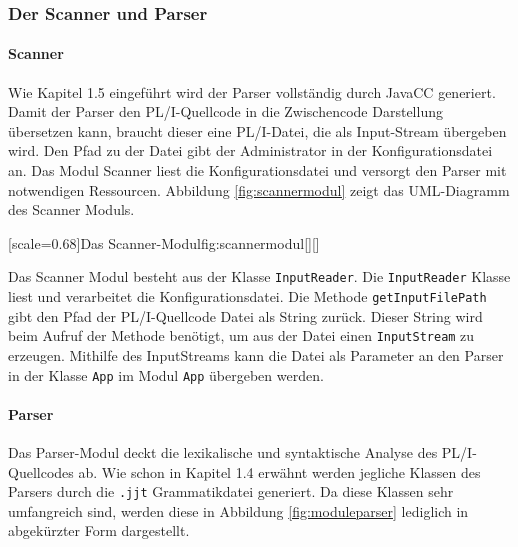 \subsubsection{Der Scanner und Parser}
\paragraph{Scanner}
Wie Kapitel 1.5 eingeführt wird der Parser vollständig durch 
JavaCC generiert.
Damit der Parser den PL/I-Quellcode in die Zwischencode Darstellung übersetzen kann,
braucht dieser eine PL/I-Datei, die als Input-Stream übergeben wird.
Den Pfad zu der Datei gibt der Administrator in der Konfigurationsdatei an.
Das Modul Scanner liest die Konfigurationsdatei und versorgt den Parser mit notwendigen Ressourcen.
Abbildung \ref{fig:scannermodul} zeigt das UML-Diagramm des Scanner Moduls.

[scale=0.68]{Das Scanner-Modul}{fig:scannermodul}[][]

Das Scanner Modul besteht aus der Klasse \verb+InputReader+. 
Die \verb+InputReader+ Klasse liest und verarbeitet die Konfigurationsdatei. Die Methode \verb+getInputFilePath+ gibt den Pfad der PL/I-Quellcode Datei als String zurück.
Dieser String wird beim Aufruf der  Methode benötigt, um aus der Datei einen \verb+InputStream+ zu erzeugen.
Mithilfe des InputStreams kann die Datei als Parameter an den Parser in der Klasse \verb+App+ im Modul \verb+App+
übergeben werden. 


\paragraph{Parser}
Das Parser-Modul deckt die lexikalische und syntaktische Analyse des PL/I-Quellcodes ab.
Wie schon in Kapitel 1.4 erwähnt werden jegliche Klassen des Parsers durch die \verb+.jjt+ Grammatikdatei generiert. Da diese Klassen sehr umfangreich sind, werden diese in Abbildung \ref{fig:moduleparser} lediglich in abgekürzter Form dargestellt. 

